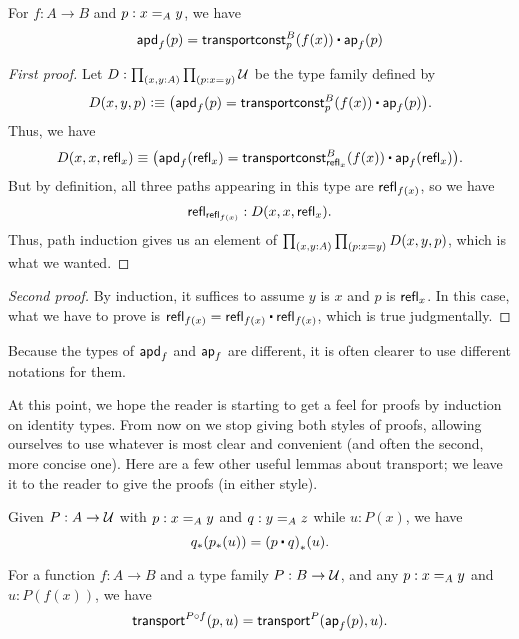 \begin{lem}\label{thm:apd-const}
  For $f:A\to B$ and $p:\id[A]xy$, we have
  \[ \apdfunc f(p) = \transconst B p{f(x)} \ct \apfunc f (p) \]
\end{lem}
\begin{proof}[First proof]
  Let $D:\prd{x,y:A}{p:\id xy} \type$ be the type family defined by
  \[ D(x,y,p) \defeq \big(\apdfunc f (p) = \transconst Bp{f(x)} \ct \apfunc f (p)\big). \]
  Thus, we have
  \[D(x,x,\refl x) \jdeq \big(\apdfunc f (\refl x) = \transconst B{\refl x}{f(x)} \ct \apfunc f ({\refl x})\big).\]
  But by definition, all three paths appearing in this type are $\refl{f(x)}$, so we have
  \[ \refl{\refl{f(x)}} : D(x,x,\refl x). \]
  Thus, path induction gives us an element of $\prd{x,y:A}{p:x=y} D(x,y,p)$, which is what we wanted.
\end{proof}
\begin{proof}[Second proof]
  By induction, it suffices to assume $y$ is $x$ and $p$ is $\refl x$.
  In this case, what we have to prove is $\refl{f(x)} = \refl{f(x)} \ct \refl{f(x)}$, which is true judgmentally.
\end{proof}

Because the types of $\apdfunc{f}$ and $\apfunc{f}$ are different, it is often clearer to use different notations for them.

%

At this point, we hope the reader is starting to get a feel for proofs by induction on identity types.
From now on we stop giving both styles of proofs, allowing ourselves to use whatever is most clear and convenient (and often the second, more concise one).
Here are a few other useful lemmas about transport; we leave it to the reader to give the proofs (in either style).

\begin{lem}\label{thm:transport-concat}
  Given $P:A\to\type$ with $p:\id[A]xy$ and $q:\id[A]yz$ while $u:P(x)$, we have
  \[ \trans{q}{\trans{p}{u}} = \trans{(p\ct q)}{u}. \]
\end{lem}

\begin{lem}\label{thm:transport-compose}
  For a function $f:A\to B$ and a type family $P:B\to\type$, and any $p:\id[A]xy$ and $u:P(f(x))$, we have
  \[ \transfib{P\circ f}{p}{u} = \transfib{P}{\apfunc f(p)}{u}. \]
\end{lem}

